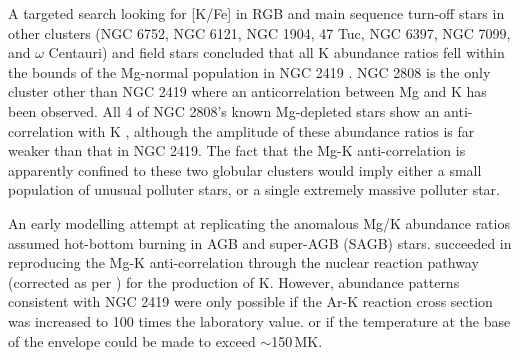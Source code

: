 \documentclass[a4paper,fleqn,usenatbib]{mnras}
\begin{document}
A targeted search looking for [K/Fe] in RGB and main sequence turn-off stars in other clusters (NGC 6752, NGC 6121, NGC 1904, 47 Tuc, NGC 6397, NGC 7099, and $\omega$ Centauri) and field stars concluded that all K abundance ratios fell within the bounds of the Mg-normal population in NGC 2419 \citep{carretta2013}. 
NGC 2808 is the only cluster other than NGC 2419 where an anticorrelation between Mg and K has been observed. All 4 of NGC 2808's known Mg-depleted stars show an anti-correlation with K \citep{mucciarelli2015}, although the amplitude of these abundance ratios is far weaker than that in NGC 2419. The fact that the Mg-K anti-correlation is apparently confined to these two globular clusters would imply either a small population of unusual polluter stars, or a single extremely massive polluter star.



An early modelling attempt at replicating the anomalous Mg/K abundance ratios assumed hot-bottom burning in AGB and super-AGB (SAGB) stars. \cite{ventura2012} succeeded in reproducing the Mg-K anti-correlation through the nuclear reaction pathway  (corrected as per \cite{iliadis2016}) for the production of K. However, abundance patterns consistent with NGC 2419 were only possible if the Ar-K reaction cross section was increased to 100 times the laboratory value. or if the temperature at the base of the envelope could be made to exceed $\sim$150\,MK.
\end{document}
